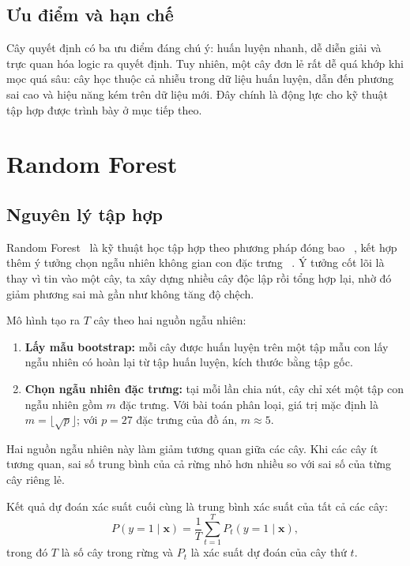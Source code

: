 \subsection{Ưu điểm và hạn chế}

Cây quyết định có ba ưu điểm đáng chú ý: huấn luyện nhanh, dễ diễn giải và trực
quan hóa logic ra quyết định. Tuy nhiên, một cây đơn lẻ rất dễ quá khớp
 khi mọc quá sâu: cây học thuộc cả nhiễu trong dữ liệu huấn
luyện, dẫn đến phương sai cao và hiệu năng kém trên dữ liệu mới. Đây chính là
động lực cho kỹ thuật tập hợp được trình bày ở mục tiếp theo.

\section{Random Forest}

\subsection{Nguyên lý tập hợp}

Random Forest~\cite{Breiman2001} là kỹ thuật học tập hợp  theo phương pháp đóng bao ~\cite{Breiman1996}, kết hợp
thêm ý tưởng chọn ngẫu nhiên không gian con đặc trưng
~\cite{Ho1995}. Ý tưởng cốt lõi là thay vì tin vào một
cây, ta xây dựng nhiều cây độc lập rồi tổng hợp lại, nhờ đó giảm phương sai mà
gần như không tăng độ chệch.

Mô hình tạo ra $T$ cây theo hai nguồn ngẫu nhiên:

\begin{enumerate}[leftmargin=1.6em, itemsep=3pt]
  \item \textbf{Lấy mẫu bootstrap:} mỗi cây được huấn luyện trên một tập mẫu
        con lấy ngẫu nhiên có hoàn lại từ tập huấn luyện, kích thước bằng tập
        gốc.
  \item \textbf{Chọn ngẫu nhiên đặc trưng:} tại mỗi lần chia nút, cây chỉ xét
        một tập con ngẫu nhiên gồm $m$ đặc trưng. Với bài toán phân loại,
        giá trị mặc định là $m = \lfloor\sqrt{p}\rfloor$; với $p = 27$ đặc
        trưng của đồ án, $m \approx 5$.
\end{enumerate}

Hai nguồn ngẫu nhiên này làm giảm tương quan giữa các cây. Khi các cây ít tương
quan, sai số trung bình của cả rừng nhỏ hơn nhiều so với sai số của từng cây
riêng lẻ.

Kết quả dự đoán xác suất cuối cùng là trung bình xác suất của tất cả các cây:
\begin{equation}
P(y=1 \mid \mathbf{x}) = \frac{1}{T} \sum_{t=1}^{T} P_t(y=1 \mid \mathbf{x}),
\label{eq:rf}
\end{equation}
trong đó $T$ là số cây trong rừng và $P_t$ là xác suất dự đoán của cây thứ $t$.

